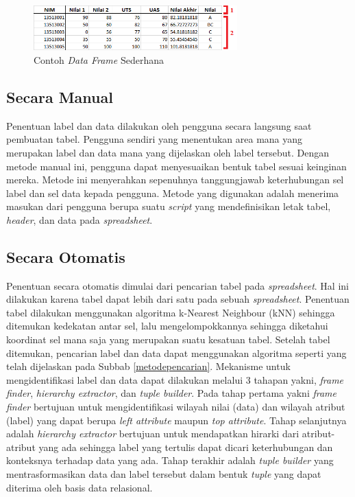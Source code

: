 \begin{figure}[htb]
    \centering
    \includegraphics[width=0.7\textwidth]{resources/chapter-3-simple-dataframe2.png}
    \caption{Contoh \textit{Data Frame} Sederhana}
	\label{DataFrameSederhana}
\end{figure}

	\subsection{Secara Manual}
	Penentuan label dan data dilakukan oleh pengguna secara langsung saat pembuatan tabel. Pengguna sendiri yang menentukan area mana yang merupakan label dan data mana yang dijelaskan oleh label tersebut. Dengan metode manual ini, pengguna dapat menyesuaikan bentuk tabel sesuai keinginan mereka. Metode ini menyerahkan sepenuhnya tanggungjawab keterhubungan sel label dan sel data kepada pengguna. Metode yang digunakan adalah menerima masukan dari pengguna berupa suatu \textit{script} yang mendefinisikan letak tabel, \textit{header}, dan data pada \textit{spreadsheet}.

	\subsection{Secara Otomatis}
	Penentuan secara otomatis dimulai dari pencarian tabel pada \textit{spreadsheet}. Hal ini dilakukan karena tabel dapat lebih dari satu pada sebuah \textit{spreadsheet}. Penentuan tabel dilakukan menggunakan algoritma k-Nearest Neighbour (kNN) sehingga ditemukan kedekatan antar sel, lalu mengelompokkannya sehingga diketahui koordinat sel mana saja yang merupakan suatu kesatuan tabel. Setelah tabel ditemukan, pencarian label dan data dapat menggunakan algoritma seperti yang telah dijelaskan pada Subbab \ref{metodepencarian}. Mekanisme untuk mengidentifikasi label dan data dapat dilakukan melalui 3 tahapan yakni, \textit{frame finder}, \textit{hierarchy extractor}, dan \textit{tuple builder}. Pada tahap pertama yakni \textit{frame finder} bertujuan untuk mengidentifikasi wilayah nilai (data) dan wilayah atribut (label) yang dapat berupa \textit{left attribute} maupun \textit{top attribute}. Tahap selanjutnya adalah \textit{hierarchy extractor} bertujuan untuk mendapatkan hirarki dari atribut-atribut yang ada sehingga label yang tertulis dapat dicari keterhubungan dan konteksnya terhadap data yang ada. Tahap terakhir adalah \textit{tuple builder} yang mentrasformasikan data dan label tersebut dalam bentuk \textit{tuple} yang dapat diterima oleh basis data relasional.

